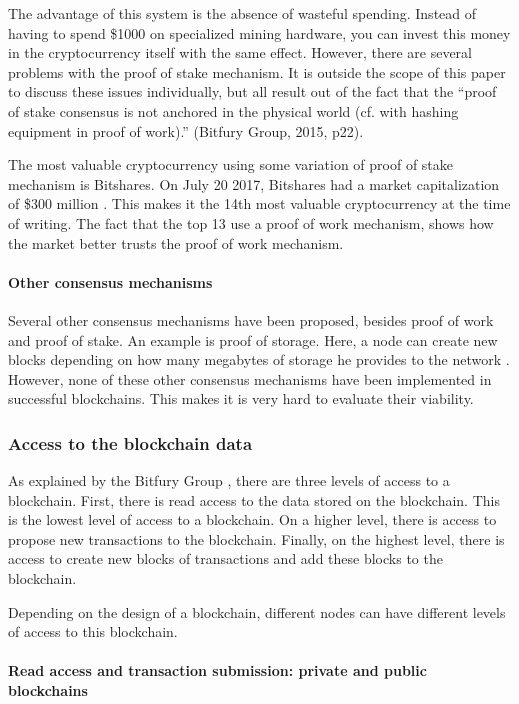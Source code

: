 The advantage of this system is the absence of wasteful spending. Instead of having to spend \$1000 on specialized mining hardware, you can invest this money in the cryptocurrency itself with the same effect. However, there are several problems with the proof of stake mechanism. It is outside the scope of this paper to discuss these issues individually, but all result out of the fact that the ``proof of stake consensus is not anchored in the physical world (cf. with hashing equipment in proof of work).'' (Bitfury Group, 2015, p22). 

The most valuable cryptocurrency using some variation of proof of stake mechanism is Bitshares. On July 20 2017, Bitshares had a market capitalization of \$300 million \cite{general-market-cap}. This makes it the 14th most valuable cryptocurrency at the time of writing. The fact that the top 13 use a proof of work mechanism, shows how the market better trusts the proof of work mechanism.

\paragraph{Other consensus mechanisms}

Several other consensus mechanisms have been proposed, besides proof of work and proof of stake. An example is proof of storage. Here, a node can create new blocks depending on how many megabytes of storage he provides to the network \cite{proof-of-whatever}. However, none of these other consensus mechanisms have been implemented in successful blockchains. This makes it is very hard to evaluate their viability. 

\subsubsection{Access to the blockchain data}

As explained by the Bitfury Group \cite{bitfury-permissioned}, there are three levels of access to a blockchain. First, there is read access to the data stored on the blockchain. This is the lowest level of access to a blockchain. On a higher level, there is access to propose new transactions to the blockchain. Finally, on the highest level, there is access to create new blocks of transactions and add these blocks to the blockchain.

Depending on the design of a blockchain, different nodes can have different levels of access to this blockchain.

\paragraph{Read access and transaction submission: private and public blockchains}

